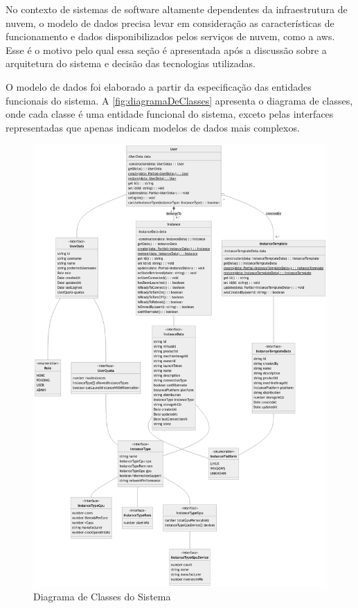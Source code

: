 No contexto de sistemas de software altamente dependentes da infraestrutura de nuvem, o modelo de dados precisa levar em consideração as características de funcionamento e dados disponibilizados pelos serviços de nuvem, como a \gls{aws}. Esse é o motivo pelo qual essa seção é apresentada após a discussão sobre a arquitetura do sistema e decisão das tecnologias utilizadas.

O modelo de dados foi elaborado a partir da especificação das entidades funcionais do sistema. A \autoref{fig:diagramaDeClasses} apresenta o diagrama de classes, onde cada classe é uma entidade funcional do sistema, exceto pelas interfaces representadas que apenas indicam modelos de dados mais complexos.

\begin{figure}[H]
\caption{Diagrama de Classes do Sistema}
\label{fig:diagramaDeClasses}
\includegraphics[width=\textwidth]{capitulos/2-metodologia/files/class-diagram.png}
\end{figure}

